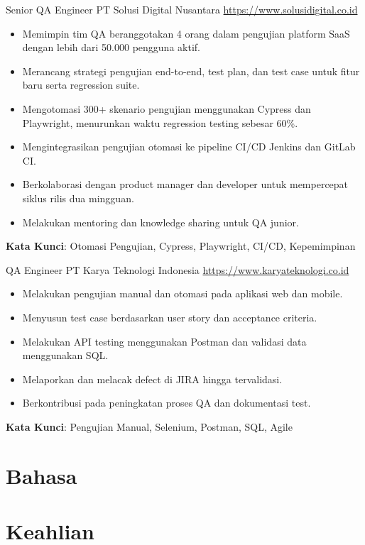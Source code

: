 \documentclass[a4paper, serif, 10pt]{moderncv}
\begin{document}
        {Senior QA Engineer}
        {PT Solusi Digital Nusantara}
        {\url{https://www.solusidigital.co.id}}
        {}
        {\begin{itemize}
\item Memimpin tim QA beranggotakan 4 orang dalam pengujian platform SaaS dengan lebih dari 50.000 pengguna aktif.
\item Merancang strategi pengujian end-to-end, test plan, dan test case untuk fitur baru serta regression suite.
\item Mengotomasi 300+ skenario pengujian menggunakan Cypress dan Playwright, menurunkan waktu regression testing sebesar 60\%.
\item Mengintegrasikan pengujian otomasi ke pipeline CI/CD Jenkins dan GitLab CI.
\item Berkolaborasi dengan product manager dan developer untuk mempercepat siklus rilis dua mingguan.
\item Melakukan mentoring dan knowledge sharing untuk QA junior.
\end{itemize}
\textbf{Kata Kunci}: Otomasi Pengujian, Cypress, Playwright, CI/CD, Kepemimpinan}

        {QA Engineer}
        {PT Karya Teknologi Indonesia}
        {\url{https://www.karyateknologi.co.id}}
        {}
        {\begin{itemize}
\item Melakukan pengujian manual dan otomasi pada aplikasi web dan mobile.
\item Menyusun test case berdasarkan user story dan acceptance criteria.
\item Melakukan API testing menggunakan Postman dan validasi data menggunakan SQL.
\item Melaporkan dan melacak defect di JIRA hingga tervalidasi.
\item Berkontribusi pada peningkatan proses QA dan dokumentasi test.
\end{itemize}
\textbf{Kata Kunci}: Pengujian Manual, Selenium, Postman, SQL, Agile}
\section{Bahasa}

\section{Keahlian}
\end{document}
